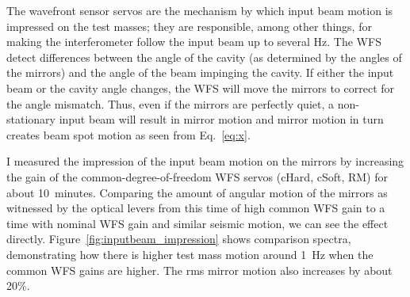 
The wavefront sensor servos are the mechanism by which input beam
motion is impressed on the test masses; they are responsible, among
other things, for making the interferometer follow the input beam up
to several Hz. The WFS detect differences between the angle of the
cavity (as determined by the angles of the mirrors) and the angle of
the beam impinging the cavity. If either the input beam or the cavity
angle changes, the WFS will move the mirrors to correct for the angle
mismatch. Thus, even if the mirrors are perfectly quiet, a
non-stationary input beam will result in mirror motion and mirror
motion in turn creates beam spot motion as seen from Eq.~\ref{eq:x}.

I measured the impression of the input beam motion on the mirrors by
increasing the gain of the common-degree-of-freedom WFS servos (cHard,
cSoft, RM) for about 10~minutes. Comparing the amount of angular motion
of the mirrors as witnessed by the optical levers from this time of
high common WFS gain to a time with nominal WFS gain and similar
seismic motion, we can see the effect
directly. Figure~\ref{fig:inputbeam_impression} shows comparison
spectra, demonstrating how there is higher test mass motion around
1~Hz when the common WFS gains are higher. The rms mirror motion also
increases by about 20\%.

